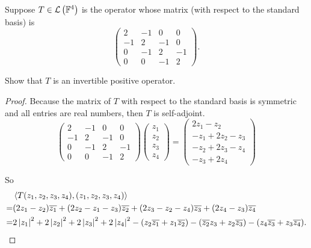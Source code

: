 \begin{exercise}
    Suppose $T\in\mathcal{L}\left({\mathbb{F}^{4}}\right)$ is the operator whose matrix (with respect to the standard basis) is
    \[
        \begin{pmatrix}
            2  & -1 & 0  & 0  \\
            -1 & 2  & -1 & 0  \\
            0  & -1 & 2  & -1 \\
            0  & 0  & -1 & 2
        \end{pmatrix}.
    \]

    Show that $T$ is an invertible positive operator.
\end{exercise}

\begin{proof}
    Because the matrix of $T$ with respect to the standard basis is symmetric and all entries are real numbers, then $T$ is self-adjoint.
    \[
        \begin{pmatrix}
            2  & -1 & 0  & 0  \\
            -1 & 2  & -1 & 0  \\
            0  & -1 & 2  & -1 \\
            0  & 0  & -1 & 2
        \end{pmatrix}
        \begin{pmatrix}
            z_{1} \\
            z_{2} \\
            z_{3} \\
            z_{4}
        \end{pmatrix} =
        \begin{pmatrix}
            2z_{1} - z_{2}          \\
            -z_{1} + 2z_{2} - z_{3} \\
            -z_{2} + 2z_{3} - z_{4} \\
            -z_{3} + 2z_{4}
        \end{pmatrix}
    \]

    So
    \begin{align*}
          & \left\langle{T(z_{1}, z_{2}, z_{3}, z_{4}), (z_{1}, z_{2}, z_{3}, z_{4})}\right\rangle                                                                                                                                  \\
        = & (2z_{1} - z_{2})\overline{z_{1}} + (2z_{2} - z_{1} - z_{3})\overline{z_{2}} + (2z_{3} - z_{2} - z_{4})\overline{z_{3}} + (2z_{4} - z_{3})\overline{z_{4}}                                                                \\
        = & 2\left\vert{z_{1}}\right\vert^{2} + 2\left\vert{z_{2}}\right\vert^{2} + 2\left\vert{z_{3}}\right\vert^{2} + 2\left\vert{z_{4}}\right\vert^{2} - (z_{2}\overline{z_{1}} + z_{1}\overline{z_{2}}) - (\overline{z_{2}}z_{3} + z_{2}\overline{z_{3}}) - (z_{4}\overline{z_{3}} + z_{3}\overline{z_{4}}).
    \end{align*}


\end{proof}
